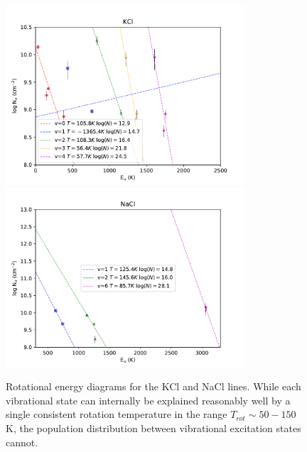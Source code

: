 \documentclass[twocolumn]{aastex62}
\begin{document}
\begin{figure}[!htp]
\includegraphics[scale=1,width=3.5in]{figures/KCl_rotational_diagrams.pdf}
\includegraphics[scale=1,width=3.5in]{figures/NaCl_rotational_diagrams.pdf}
\caption{Rotational energy diagrams for the KCl and NaCl lines.  While each
vibrational state can internally be explained reasonably well by a single
consistent rotation temperature in the range $T_{rot}\sim50-150$ K, the population
distribution between vibrational excitation states cannot.}
\label{fig:rotationdiagrams}
\end{figure}










\end{document}
